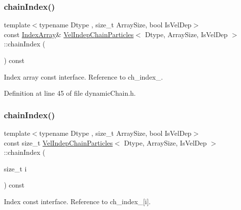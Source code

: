\subsubsection{\texorpdfstring{chain\+Index()}{chainIndex()}\hspace{0.1cm}{\footnotesize\ttfamily [1/2]}}
{\footnotesize\ttfamily template$<$typename Dtype , size\+\_\+t Array\+Size, bool Is\+Vel\+Dep$>$ \\
const \mbox{\hyperlink{class_vel_indep_chain_particles_a691749351fb710d16619ef6cc43bb1e6}{Index\+Array}}\& \mbox{\hyperlink{class_vel_indep_chain_particles}{Vel\+Indep\+Chain\+Particles}}$<$ Dtype, Array\+Size, Is\+Vel\+Dep $>$\+::chain\+Index (\begin{DoxyParamCaption}{ }\end{DoxyParamCaption}) const\hspace{0.3cm}{\ttfamily [inline]}}



Index array const interface. Reference to ch\+\_\+index\+\_\+. 



Definition at line 45 of file dynamic\+Chain.\+h.

\mbox{\label{class_vel_indep_chain_particles_ad2cec742c8fa63849b9ff5b8876f879a}} 
\subsubsection{\texorpdfstring{chain\+Index()}{chainIndex()}\hspace{0.1cm}{\footnotesize\ttfamily [2/2]}}
{\footnotesize\ttfamily template$<$typename Dtype , size\+\_\+t Array\+Size, bool Is\+Vel\+Dep$>$ \\
const size\+\_\+t \mbox{\hyperlink{class_vel_indep_chain_particles}{Vel\+Indep\+Chain\+Particles}}$<$ Dtype, Array\+Size, Is\+Vel\+Dep $>$\+::chain\+Index (\begin{DoxyParamCaption}\item[{size\+\_\+t}]{i }\end{DoxyParamCaption}) const\hspace{0.3cm}{\ttfamily [inline]}}



Index const interface. Reference to ch\+\_\+index\+\_\+\mbox{[}i\mbox{]}. 



